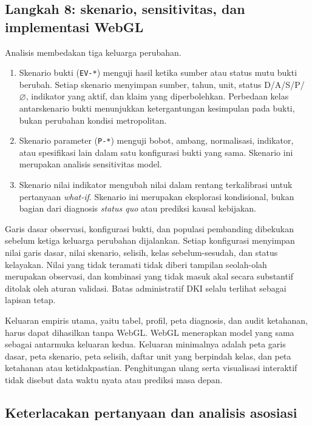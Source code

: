 \documentclass[11pt,a4paper,oneside,openany,indonesian]{report}
\begin{document}
\subsection{Langkah 8: skenario, sensitivitas, dan implementasi
WebGL}\label{langkah-8-skenario-sensitivitas-dan-implementasi-webgl}

Analisis membedakan tiga keluarga perubahan.

\begin{enumerate}
\def\labelenumi{\arabic{enumi}.}
\tightlist
\item
  Skenario bukti (\texttt{EV-*}) menguji hasil ketika sumber
  atau status mutu bukti berubah. Setiap skenario menyimpan sumber,
  tahun, unit, status D/A/S/P/\(\varnothing\), indikator yang aktif, dan
  klaim yang diperbolehkan. Perbedaan kelas antarskenario bukti
  menunjukkan ketergantungan kesimpulan pada bukti, bukan perubahan
  kondisi metropolitan.
\item
  Skenario parameter (\texttt{P-*}) menguji bobot, ambang,
  normalisasi, indikator, atau spesifikasi lain dalam satu konfigurasi
  bukti yang sama. Skenario ini merupakan analisis sensitivitas model.
\item
  Skenario nilai indikator mengubah nilai dalam rentang
  terkalibrasi untuk pertanyaan \emph{what-if}. Skenario ini merupakan
  eksplorasi kondisional, bukan bagian dari diagnosis \emph{status quo}
  atau prediksi kausal kebijakan.
\end{enumerate}

Garis dasar observasi, konfigurasi bukti, dan populasi pembanding
dibekukan sebelum ketiga keluarga perubahan dijalankan. Setiap
konfigurasi menyimpan nilai garis dasar, nilai skenario, selisih, kelas
sebelum-sesudah, dan status kelayakan. Nilai yang tidak teramati tidak
diberi tampilan seolah-olah merupakan observasi, dan kombinasi yang
tidak masuk akal secara substantif ditolak oleh aturan validasi. Batas
administratif DKI selalu terlihat sebagai lapisan tetap.

Keluaran empiris utama, yaitu tabel, profil, peta diagnosis, dan audit
ketahanan, harus dapat dihasilkan tanpa WebGL. WebGL menerapkan model
yang sama sebagai antarmuka keluaran kedua. Keluaran minimalnya adalah
peta garis dasar, peta skenario, peta selisih, daftar unit yang
berpindah kelas, dan peta ketahanan atau ketidakpastian. Penghitungan
ulang serta visualisasi interaktif tidak disebut data waktu nyata atau
prediksi masa depan.

\subsection{Keterlacakan pertanyaan dan analisis
asosiasi}\label{keterlacakan-pertanyaan-dan-analisis-asosiasi}
\end{document}
